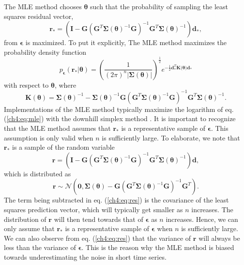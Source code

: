 The MLE method chooses $\mathbf{\theta}$ such that the probability of sampling the least squares residual vector,
\begin{equation}
  \mathbf{r}_* =  \left(\mathbf{I} - 
                  \mathbf{G}\left(\mathbf{G}^T\mathbf{\Sigma}(\mathbf{\theta})^{-1}
                  \mathbf{G}\right)^{-1}\mathbf{G}^T\mathbf{\Sigma}(\mathbf{\theta})^{-1}\right)
                  \mathbf{d_*},
\end{equation}  
from $\mathbf{\epsilon}$ is maximized. To put it explicitly, The MLE method maximizes the probability density function
\begin{equation}\label{ch4:eq:mle}
p_\mathbf{\epsilon}(\mathbf{r}_*|\mathbf{\theta}) = 
\left(\frac{1}{(2\pi)^n\left| \mathbf{\Sigma}(\mathbf{\theta}) \right|}\right)^{\frac{1}{2}} 
e^{-\tfrac{1}{2}\mathbf{d}_*^T\mathbf{K(\mathbf{\theta}})\mathbf{d}_*}
\end{equation}
with respect to $\mathbf{\theta}$, where
\begin{equation}
\mathbf{K}(\mathbf{\theta}) = \mathbf{\Sigma}(\mathbf{\theta})^{-1} - 
                              \mathbf{\Sigma}(\mathbf{\theta})^{-1}\mathbf{G}
                              \left(\mathbf{G}^T\mathbf{\Sigma}(\mathbf{\theta})^{-1}\mathbf{G}\right)^{-1}
                              \mathbf{G}^T\mathbf{\Sigma}(\mathbf{\theta})^{-1}.
\end{equation}
Implementations of the MLE method typically maximize the logarithm of eq. (\ref{ch4:eq:mle}) with the downhill simplex method \citep{Press2007}. It is important to recognize that the MLE method assumes that $\mathbf{r}_*$ is a representative sample of $\mathbf{\epsilon}$. This assumption is only valid when $n$ is sufficiently large. To elaborate, we note that $\mathbf{r_*}$ is a sample of the random variable
\begin{equation}
  \mathbf{r} =  \left(\mathbf{I} - 
                \mathbf{G}\left(\mathbf{G}^T\mathbf{\Sigma}(\mathbf{\theta})^{-1}\mathbf{G}\right)^{-1}
                \mathbf{G}^T\mathbf{\Sigma}(\mathbf{\theta})^{-1}\right)\mathbf{d},
\end{equation}  
which is distributed as
\begin{equation}\label{ch4:eq:res}
  \mathbf{r} \sim \mathcal{N}\left(\mathbf{0},
                  \mathbf{\Sigma}(\mathbf{\theta}) - 
                  \mathbf{G}\left(\mathbf{G}^T\mathbf{\Sigma}(\mathbf{\theta})^{-1}
                  \mathbf{G}\right)^{-1}\mathbf{G}^T\right).
\end{equation}
The term being subtracted in eq. (\ref{ch4:eq:res}) is the covariance of the least squares prediction vector, which will typically get smaller as $n$ increases. The distribution of $\mathbf{r}$ will then tend towards that of $\mathbf{\epsilon}$ as $n$ increases. Hence, we can only assume that $\mathbf{r}_*$ is a representative sample of $\mathbf{\epsilon}$ when $n$ is sufficiently large. We can also observe from eq. (\ref{ch4:eq:res}) that the variance of $\mathbf{r}$ will always be less than the variance of $\mathbf{\epsilon}$. This is the reason why the MLE method is biased towards underestimating the noise in short time series.


